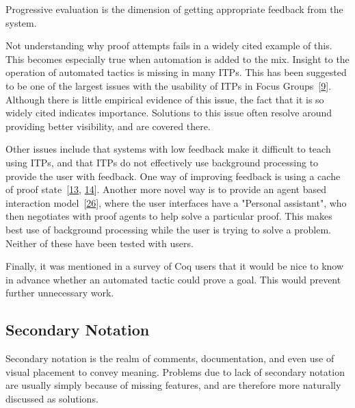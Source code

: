 \documentclass[
]{article}
\begin{document}
Progressive evaluation is the dimension of getting appropriate feedback
from the system.

Not understanding why proof attempts fails in a widely cited example of
this. This becomes especially true when automation is added to the mix.
Insight to the operation of automated tactics is missing in many ITPs.
This has been suggested to be one of the largest issues with the
usability of ITPs in Focus
Groups~{[}\protect\hyperlink{ref-beckert_usability_2015}{9}{]}. Although
there is little empirical evidence of this issue, the fact that it is so
widely cited indicates importance. Solutions to this issue often resolve
around providing better visibility, and are covered there.

Other issues include that systems with low feedback make it difficult to
teach using ITPs, and that ITPs do not effectively use background
processing to provide the user with feedback. One way of improving
feedback is using a cache of proof
state~{[}\protect\hyperlink{ref-berman_development_2014}{13},
\protect\hyperlink{ref-bourke_challenges_2012}{14}{]}. Another more
novel way is to provide an agent based interaction
model~{[}\protect\hyperlink{ref-hunter_agent-based_2005}{26}{]}, where
the user interfaces have a "Personal assistant", who then negotiates
with proof agents to help solve a particular proof. This makes best use
of background processing while the user is trying to solve a problem.
Neither of these have been tested with users.

Finally, it was mentioned in a survey of Coq users that it would be nice
to know in advance whether an automated tactic could prove a goal. This
would prevent further unnecessary work.

\hypertarget{secondary-notation-1}{%
\subsection{Secondary Notation}\label{secondary-notation-1}}

Secondary notation is the realm of comments, documentation, and even use
of visual placement to convey meaning. Problems due to lack of secondary
notation are usually simply because of missing features, and are
therefore more naturally discussed as solutions.
\end{document}
